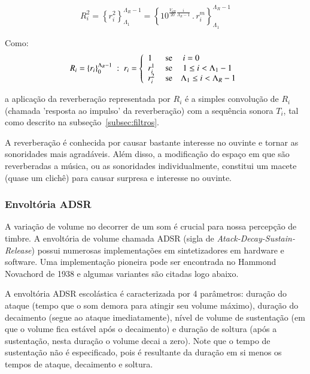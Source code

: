 \begin{equation}\label{eq:p2rev}
    R_i^2=\left\{r_i^2\right\}_{\Lambda_1}^{\Lambda_R-1}=\left\{10^{\frac{V_{dB}}{20}\frac{i}{\Lambda_R-1}}\,.\,r_i^m\right\}_{\Lambda_1}^{\Lambda_R-1}
\end{equation}

Como:
\begin{equation}\label{eq:rev}
    R_i=\left\{r_i\right\}_0^{\Lambda_R-1}\;:\;r_i=\left\{
        \begin{array}{l l}
            1\; & \text{se }\quad i=0 \\
            r_i^1\;  & \text{se }\quad 1\leq i<\Lambda_1-1 \\
                                     r_i^2 \; & \text{se}\quad \Lambda_1 \leq i < \Lambda_R-1 \\
        \end{array} \right.
\end{equation}

a aplicação da reverberação representada por $R_i$ é a simples convolução de $R_i$ (chamada 'resposta ao impulso' da reverberação) com a sequência sonora $T_i$, tal como descrito na subseção~\ref{subsec:filtros}.

A reverberação é conhecida por causar bastante interesse no ouvinte e tornar as sonoridades mais agradáveis. Além disso, a modificação do espaço em que são reverberadas a música, ou as sonoridades individualmente, constitui um macete (quase um clichê) para causar surpresa e interesse no ouvinte. 



\subsubsection{Envoltória ADSR}
A variação de volume no decorrer de um som é crucial para nossa percepção de timbre. A envoltória de volume chamada ADSR (sigla de \emph{Atack-Decay-Sustain-Release}) possui numerosas implementações em sintetizadores em hardware e software. Uma implementação pioneira pode ser encontrada no Hammond Novachord de 1938 e algumas variantes são citadas logo abaixo.\cite{ADSR}

A envoltória ADSR escolástica é caracterizada por 4 parâmetros: duração do ataque (tempo que o som demora para atingir seu volume máximo), duração do decaimento (segue ao ataque imediatamente), nível de volume de sustentação (em que o volume fica estável após o decaimento) e duração de soltura (após a sustentação, nesta duração o volume decai a zero).
Note que o tempo de sustentação não é especificado, pois é resultante da duração em si menos os tempos de ataque, decaimento e soltura.

